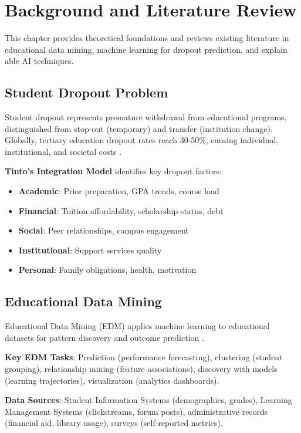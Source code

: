 \chapter{Background and Literature Review}

This chapter provides theoretical foundations and reviews existing literature in educational data mining, machine learning for dropout prediction, and explain able AI techniques.

\section{Student Dropout Problem}

Student dropout represents premature withdrawal from educational programs, distinguished from stop-out (temporary) and transfer (institution change). Globally, tertiary education dropout rates reach 30-50\%, causing individual, institutional, and societal costs \cite{tinto2012completing, rumberger2012dropping}.

\textbf{Tinto's Integration Model} identifies key dropout factors:
\begin{itemize}
\item \textbf{Academic}: Prior preparation, GPA trends, course load
\item \textbf{Financial}: Tuition affordability, scholarship status, debt
\item \textbf{Social}: Peer relationships, campus engagement
\item \textbf{Institutional}: Support services quality
\item \textbf{Personal}: Family obligations, health, motivation
\end{itemize}

\section{Educational Data Mining}

Educational Data Mining (EDM) applies machine learning to educational datasets for pattern discovery and outcome prediction \cite{romero2020educational, baker2011data}.

\textbf{Key EDM Tasks}: Prediction (performance forecasting), clustering (student grouping), relationship mining (feature associations), discovery with models (learning trajectories), visualization (analytics dashboards).

\textbf{Data Sources}: Student Information Systems (demographics, grades), Learning Management Systems (clickstreams, forum posts), administrative records (financial aid, library usage), surveys (self-reported metrics).

